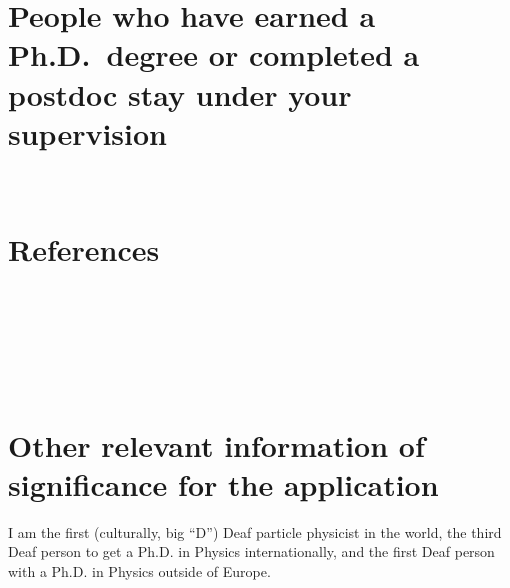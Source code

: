 \vspace{-2.0em}\section{People who have earned a Ph.D.~degree or completed a postdoc stay under your supervision\noneyet} \label{sec:people-who-have-earned-a-phd-degree-or-completed-a-postdoc-stay-under-your-supervision--noneyet}
\, \\

\vspace{-4.5em}\section{References} \label{sec:references}
{
\footnotesize
{}\\
\\
\\
\\
\\
}

\vspace{-2.0em}\section{Other relevant information of significance for the application} \label{sec:other-relevant-information-of-significance-for-the-application}
I am the first (culturally, big \enquote{D}) Deaf particle physicist in the world, the third Deaf person to get a Ph.D. in Physics internationally, and the first Deaf person with a Ph.D. in Physics outside of Europe.
